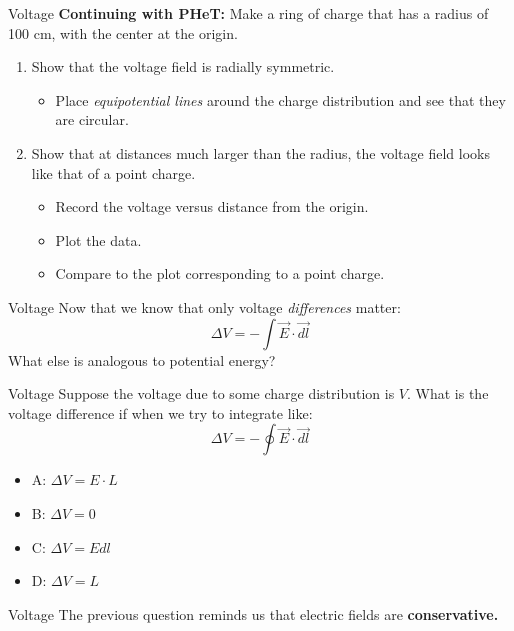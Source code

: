 \documentclass{beamer}
\begin{document}
\begin{frame}{Voltage}
\textbf{Continuing with PHeT:} Make a ring of charge that has a radius of 100 cm, with the center at the origin.
\begin{enumerate}
\item Show that the voltage field is radially symmetric.
\begin{itemize}
\item Place \textit{equipotential lines} around the charge distribution and see that they are circular.
\end{itemize}
\item Show that at distances much larger than the radius, the voltage field looks like that of a point charge.
\begin{itemize}
\item Record the voltage versus distance from the origin.
\item Plot the data.
\item Compare to the plot corresponding to a point charge.
\end{itemize}
\end{enumerate} 
\end{frame}

\begin{frame}{Voltage}
Now that we know that only voltage \textit{differences} matter:
\begin{equation}
\Delta V = - \int \vec{E} \cdot \vec{dl}
\end{equation}
What else is analogous to potential energy?
\end{frame}

\begin{frame}{Voltage}
Suppose the voltage due to some charge distribution is $V$.  What is the voltage difference if when we try to integrate like:
\begin{equation}
\Delta V = - \oint \vec{E} \cdot \vec{dl}
\end{equation}
\begin{itemize}
\item A: $\Delta V = E \cdot L$
\item B: $\Delta V = 0$
\item C: $\Delta V = E dl$
\item D: $\Delta V = L$
\end{itemize}
\end{frame}

\begin{frame}{Voltage}
The previous question reminds us that electric fields are \textbf{conservative.}
\end{frame}
\end{document}
